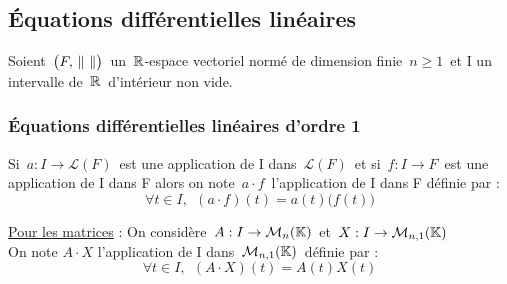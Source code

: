 \vspace{1.5cm}

\subsection{Équations différentielles linéaires}

\vspace{1cm}

\begin{center}
    Soient \(\,\bigl(F,\,\norm{\ }\bigr)\,\) un \(\,\mathbb{R}\)-espace vectoriel normé de dimension finie \(\,n\geq 1\,\) et I un intervalle de \(\,\mathbb{R}\,\) d'intérieur non vide.
\end{center}

\vspace{0.5cm}

\subsubsection[EDL d'ordre 1]{Équations différentielles linéaires d'ordre 1}

\vspace{1.5cm}

Si \(\,a:I\to \mathscr{L}(F)\,\) est une application de I dans \(\,\mathscr{L}(F)\,\) et si \(\,f:I\to F\,\) est une application de I dans F alors on note \(\,a\cdot f\,\) l'application de I dans F définie par :\vspace{-0.2cm}
\[\forall t\in I,\ \ (a\cdot f)(t)=a(t)\bigl(f(t)\bigr)\]

\vspace{0.7cm}

\underline{Pour les matrices} : On considère \(\,A:I\to\mathcal{M}_n(\mathbb{K})\,\) et \(\, X:I\to \mathcal{M}_{n,1}(\mathbb{K}) \)\vspace{0.1cm}\\
On note \(A\cdot X\) l'application de I dans \(\,\mathcal{M}_{n,1}(\mathbb{K})\, \) définie par :\vspace{-0.2cm}
\[\forall t\in I,\ \ \left(A\cdot X\right)(t)=A(t)X(t)\]

\newpage

